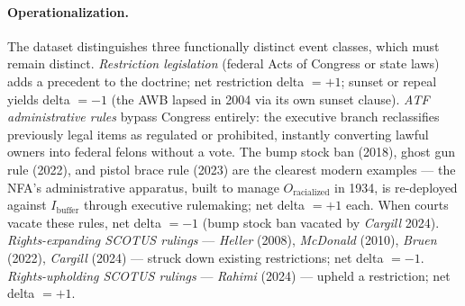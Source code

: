 \paragraph{Operationalization.}
The dataset distinguishes three functionally distinct event classes, which must remain distinct. \textit{Restriction legislation} (federal Acts of Congress or state laws) adds a precedent to the doctrine; net restriction delta $= +1$; sunset or repeal yields delta $= -1$ (the AWB lapsed in 2004 via its own sunset clause). \textit{ATF administrative rules} bypass Congress entirely: the executive branch reclassifies previously legal items as regulated or prohibited, instantly converting lawful owners into federal felons without a vote. The bump stock ban (2018), ghost gun rule (2022), and pistol brace rule (2023) are the clearest modern examples --- the NFA's administrative apparatus, built to manage $O_{\text{racialized}}$ in 1934, is re-deployed against $I_{\text{buffer}}$ through executive rulemaking; net delta $= +1$ each. When courts vacate these rules, net delta $= -1$ (bump stock ban vacated by \textit{Cargill} 2024). \textit{Rights-expanding SCOTUS rulings} --- \textit{Heller} (2008), \textit{McDonald} (2010), \textit{Bruen} (2022), \textit{Cargill} (2024) --- struck down existing restrictions; net delta $= -1$. \textit{Rights-upholding SCOTUS rulings} --- \textit{Rahimi} (2024) --- upheld a restriction; net delta $= +1$.

